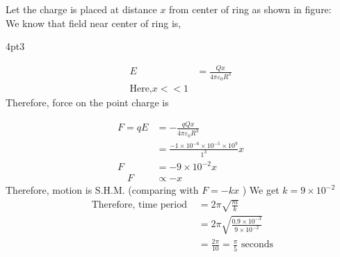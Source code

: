 \begin{enumerate}[label=\color{ocre}\textbf{\arabic*.}]
\opencutright
\renewcommand\windowpagestuff{
	\centering\texttt{[image: pset-2(6)]}}
\begin{answer}
	Let the charge is placed at distance $x$ from center of ring as shown in figure: \\
	We know that field near center of ring is,
	\begin{cutout}{2}{\dimexpr\linewidth-6cm\relax}{4pt}{3}
	
	\begin{align*}
	E&=\frac{Q x}{4 \pi \varepsilon_{0} R^{3}}\\
	\text{Here,} x<<1
	\end{align*}
	Therefore, force on the point charge is	
	\end{cutout}
	\begin{align*}
	F=q E&=-\frac{q Q x}{4 \pi \varepsilon_{0} R^{3}}\\&=\frac{-1 \times 10^{-6} \times 10^{-5} \times 10^{9}}{1^{3}} x \\
	F&=-9 \times 10^{-2} x \\
	\quad F &\propto-x
	\end{align*}
	Therefore, motion is S.H.M. (comparing with $F=-k x$ )
	We get $k=9 \times 10^{-2}$\\
	\begin{align*}
		\text { Therefore, time period }&=2 \pi \sqrt{\frac{m}{k}}\\&=2 \pi \sqrt{\frac{0.9 \times 10^{-3}}{9 \times 10^{-2}}}\\&=\frac{2 \pi}{10}=\frac{\pi}{5}\text{ seconds}
	\end{align*}



\end{answer}
\end{enumerate}
